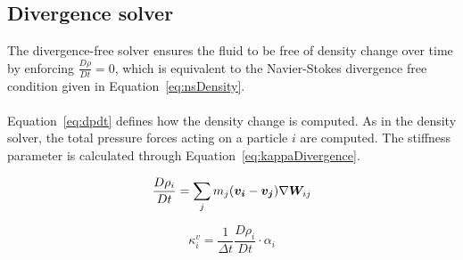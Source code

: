 \subsection{Divergence solver} \label{divergenceSolver}

    The divergence-free solver ensures the fluid to be free of density change over time by enforcing $\frac{D\rho}{Dt} = 0$, which is equivalent to the Navier-Stokes divergence free condition given in Equation~\ref{eq:nsDensity}.
    \\ \\ Equation~\ref{eq:dpdt} defines how the density change is computed.
    As in the density solver, the total pressure forces acting on a particle $i$ are computed.
    The stiffness parameter is calculated through Equation~\ref{eq:kappaDivergence}.

    \begin{equation} \label{eq:dpdt}
        \frac{D\rho_i}{Dt} = \sum_j m_j (\bm{v_i} - \bm{v_j})\nabla \bm{W}_{ij}
    \end{equation}

    \begin{equation}\label{eq:kappaDivergence}
        \kappa_i^v = \frac{1}{\Delta t} \frac{D\rho_i}{Dt} \cdot \alpha_i
    \end{equation}


